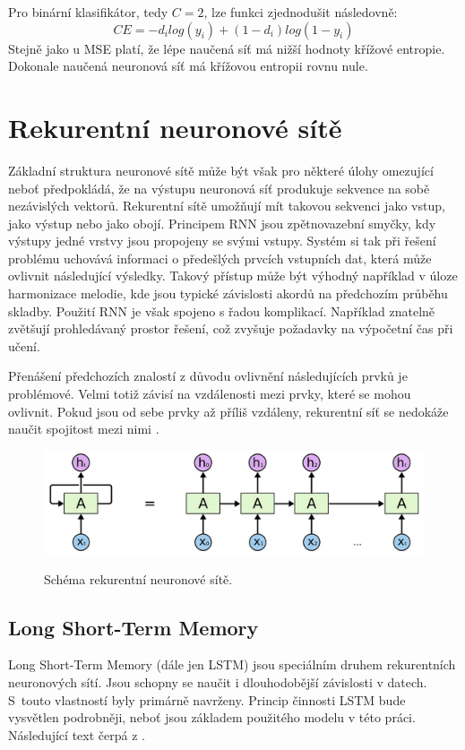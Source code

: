 Pro binární klasifikátor, tedy $C = 2$, lze funkci zjednodušit následovně:
\begin{equation}
    CE = - d_i log(y_i) + (1 - d_i) log(1 - y_i)
\end{equation}
Stejně jako u MSE platí, že lépe naučená síť má nižší hodnoty křížové entropie.
Dokonale naučená neuronová síť má křížovou entropii rovnu nule.

\section{Rekurentní neuronové sítě}
Základní struktura neuronové sítě může být však pro některé úlohy omezující 
neboť předpokládá, že na výstupu neuronová síť produkuje sekvence na sobě nezávislých vektorů.
Rekurentní sítě umožňují mít takovou sekvenci jako vstup, 
jako výstup nebo jako obojí.
Principem RNN jsou zpětnovazební smyčky, kdy výstupy jedné vrstvy jsou
propojeny se svými vstupy.
Systém si tak při řešení problému uchovává informaci
o předešlých prvcích vstupních dat,
která může ovlivnit následující výsledky\cite{Karpathy_RNNs}.
Takový přístup může být výhodný například
v úloze harmonizace melodie,
kde jsou typické závislosti akordů na předchozím průběhu skladby.
Použití RNN je však spojeno s řadou komplikací.
Například znatelně zvětšují prohledávaný prostor řešení,
což zvyšuje požadavky na výpočetní čas při učení.
\par
Přenášení předchozích znalostí z důvodu ovlivnění 
následujících prvků je problémové.
Velmi totiž závisí na vzdálenosti mezi prvky,
které se mohou ovlivnit.
Pokud jsou od sebe prvky až příliš vzdáleny,
rekurentní síť se nedokáže naučit spojitost mezi nimi
\cite{colah_lstm}.

\begin{figure}[h]\centering
    \centering
    \includegraphics[width=0.6\linewidth]{obrazky/RNNSchema.png}\\[1pt]  
    \caption{Schéma rekurentní neuronové sítě. \cite{colah_lstm}}    
    \label{obrazekSchemaRekurentniNeuronoveSite}
\end{figure}

\subsection{Long Short-Term Memory}
\label{lstmTeorie}
Long Short-Term Memory (dále jen LSTM) 
jsou speciálním druhem rekurentních neuronových sítí.
Jsou schopny se naučit i dlouhodobější závislosti v datech.
S~touto vlastností byly primárně navrženy.
Princip činnosti LSTM bude vysvětlen podrobněji,
neboť jsou základem použitého modelu v této práci.
Následující text čerpá z \cite{colah_lstm}.
\par

